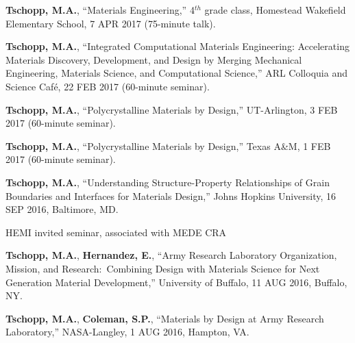 \begin{cvlist}
\item
\textbf{Tschopp, M.A.}, ``Materials Engineering,'' 4$^{th}$ grade class, Homestead Wakefield Elementary School, 7 APR 2017 (75-minute talk).

\item
\textbf{Tschopp, M.A.}, ``Integrated Computational Materials Engineering: Accelerating Materials Discovery, Development, and Design by Merging Mechanical Engineering, Materials Science, and Computational Science,'' ARL Colloquia and Science Caf\'{e}, 22 FEB 2017 (60-minute seminar).

\item
\textbf{Tschopp, M.A.}, ``Polycrystalline Materials by Design,'' UT-Arlington, 3 FEB 2017 (60-minute seminar).

\item
\textbf{Tschopp, M.A.}, ``Polycrystalline Materials by Design,'' Texas A\&M, 1 FEB 2017 (60-minute seminar).

\item
\textbf{Tschopp, M.A.}, ``Understanding Structure-Property Relationships of Grain Boundaries and Interfaces for Materials Design,'' Johns Hopkins University, 16 SEP 2016, Baltimore, MD.
\begin{list2}
\item[$\star$] HEMI invited seminar, associated with MEDE CRA
\end{list2}

\item
\textbf{Tschopp, M.A.}, \textbf{Hernandez, E.}, ``Army Research Laboratory Organization, Mission, and Research:~Combining Design with Materials Science for Next Generation Material Development,'' University of Buffalo, 11 AUG 2016, Buffalo, NY.

\item
\textbf{Tschopp, M.A.}, \textbf{Coleman, S.P.}, ``Materials by Design at Army Research Laboratory,'' NASA-Langley, 1 AUG 2016, Hampton, VA.


\end{cvlist}
